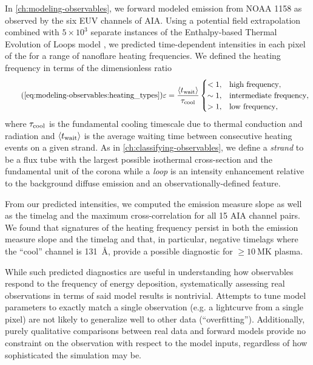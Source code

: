 In \autoref{ch:modeling-observables}, we forward modeled emission from \AR{} NOAA 1158 as observed by the six EUV channels of AIA. Using a potential field extrapolation combined with $5\times10^3$ separate instances of the Enthalpy-based Thermal Evolution of Loops model \citep[EBTEL,][]{klimchuk_highly_2008,cargill_enthalpy-based_2012,cargill_enthalpy-based_2012-1,barnes_inference_2016}, we predicted time-dependent intensities in each pixel of the \AR{} for a range of nanoflare heating frequencies. We defined the heating frequency in terms of the dimensionless ratio 
\begin{equation}\tag{\ref{eq:modeling-observables:heating_types}}
    \varepsilon = \frac{\langle\twait\rangle}{\tau_{\textup{cool}}}
    \begin{cases} 
        < 1, &  \text{high frequency},\\
        \sim1, & \text{intermediate frequency}, \\
        > 1, & \text{low frequency},
     \end{cases}
\end{equation}
where $\tau_{\textup{cool}}$ is the fundamental cooling timescale due to thermal conduction and radiation \citep[see appendix of][]{cargill_active_2014} and $\langle t_{\textup{wait}}\rangle$ is the average waiting time between consecutive heating events on a given strand. As in \autoref{ch:classifying-observables}, we define a \textit{strand} to be a flux tube with the largest possible isothermal cross-section and the fundamental unit of the corona while a \textit{loop} is an intensity enhancement relative to the background diffuse emission and an observationally-defined feature.

From our predicted intensities, we computed the emission measure slope as well as the timelag and the maximum cross-correlation for all 15 AIA channel pairs. We found that signatures of the heating frequency persist in both the emission measure slope and the timelag and that, in particular, negative timelags where the ``cool'' channel is \SI{131}{\angstrom}, provide a possible diagnostic for $\ge\SI{10}{\mega\kelvin}$ plasma.

While such predicted diagnostics are useful in understanding how observables respond to the frequency of energy deposition, systematically assessing real observations in terms of said model results is nontrivial. Attempts to tune model parameters to exactly match a single observation (e.g. a lightcurve from a single pixel) are not likely to generalize well to other data (``overfitting''). Additionally, purely qualitative comparisons between real data and forward models provide no constraint on the observation with respect to the model inputs, regardless of how sophisticated the simulation may be.

